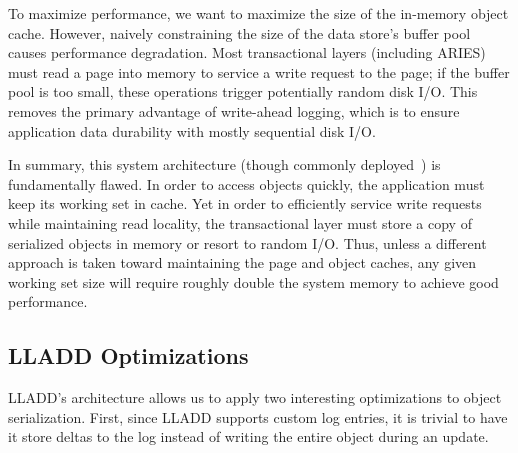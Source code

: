 \documentclass[10pt,letterpaper,twocolumn,english]{article}
\newcommand{\yad}{LLADD\xspace}
\begin{document}
To maximize performance, we want to maximize the size of the in-memory object cache.
However, naively constraining the size of the data store's buffer pool
causes performance degradation. Most transactional layers 
(including ARIES) must read a page
into memory to service a write request to the page; if the buffer pool
is too small, these operations trigger potentially random disk I/O. 
This removes the primary
advantage of write-ahead logging, which is to ensure application data
durability with mostly sequential disk I/O.

In summary, this system architecture (though commonly
deployed~\cite{hibernate,postgres}) is fundamentally
flawed.  In order to access objects quickly, the application must keep
its working set in cache.  Yet in order to efficiently service write 
requests while maintaining read locality, the
transactional layer must store a copy of serialized objects
in memory or resort to random I/O.
Thus, unless a different approach is taken toward maintaining the page and object caches, any given working set size will require roughly double the system
memory to achieve good performance.~\cite{mob}  

\subsection{\yad Optimizations}

\label{version-pages}

\yad's architecture allows us to apply two interesting optimizations
to object serialization.  First, since \yad supports
custom log entries, it is trivial to have it store deltas to
the log instead of writing the entire object during an update.

\end{document}
